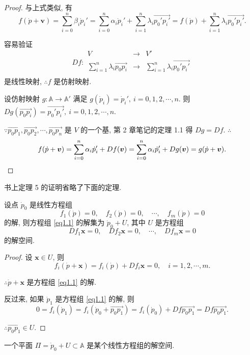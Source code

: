 \documentclass{ctexart}
\begin{document}
\begin{proof}
    与上式类似, 有
    \[f(\dot{p}+\boldsymbol{v})=\sum\limits_{i=0}^n\beta_i\dot{p}_i'=\sum\limits_{i=0}^n\alpha_i\dot{p}_i'+\sum\limits_{i=1}^n\lambda_i\overrightarrow{p_0'p_i'}=f(\dot{p})+\sum\limits_{i=1}^n\lambda_i\overrightarrow{p_0'p_i'}.\]

    容易验证
    \[Df:\begin{array}{rcl}
        V & \to & V' \\
        \sum\limits_{i=1}^n\lambda_i\overrightarrow{p_0p_i} & \to & \sum\limits_{i=1}^n\lambda_i\overrightarrow{p_0'p_i'} \\
    \end{array}\]
    是线性映射, $\therefore f$ 是仿射映射.

    设仿射映射 $g:\mathbb{A}\to\mathbb{A}'$ 满足 $g(\dot{p}_i)=\dot{p}_i',\ i=0,1,2,\cdots,n$. 则 $Dg(\overrightarrow{p_0p_i})=\overrightarrow{p_0'p_i'},\ i=0,1,2,\cdots,n$.

    $\because\overrightarrow{p_0p_1},\overrightarrow{p_0p_2},\cdots,\overrightarrow{p_0p_n}$ 是 $V$ 的一个基, 第 2 章笔记的定理 1.1 得 $Dg=Df$. $\therefore$
    \[f(\dot{p}+\boldsymbol{v})=\sum\limits_{i=0}^n\alpha_i\dot{p}_i'+Df(\boldsymbol{v})=\sum\limits_{i=0}^n\alpha_i\dot{p}_i'+Dg(\boldsymbol{v})=g(\dot{p}+\boldsymbol{v}).\qedhere\]
\end{proof}
书上定理 5 的证明省略了下面的定理.
\begin{theorem}
    设点 $\dot{p}_0$ 是线性方程组
    \begin{equation}\label{eq1.1}
        f_1(\dot{p})=0,\quad f_2(\dot{p})=0,\quad \cdots,\quad f_m(\dot{p})=0
    \end{equation}
    的解, 则方程组 \ref{eq1.1} 的解集为 $\dot{p}_0+U$, 其中 $U$ 是方程组
    \[Df_1\boldsymbol{x}=0,\quad Df_2\boldsymbol{x}=0,\quad \cdots,\quad Df_m\boldsymbol{x}=0\]
    的解空间.
\end{theorem}
\begin{proof}
    设 $\boldsymbol{x}\in U$, 则
    \[f_i(\dot{p}+\boldsymbol{x})=f_i(\dot{p})+Df_i\boldsymbol{x}=0,\quad i=1,2,\cdots,m.\]

    $\therefore\dot{p}+\boldsymbol{x}$ 是方程组 \ref{eq1.1} 的解.

    反过来, 如果 $\dot{p}_1$ 是方程组 \ref{eq1.1} 的解, 则
    \[0=f_i(\dot{p}_1)=f_i(\dot{p}_0+\overrightarrow{p_0p_1})=f_i(\dot{p}_0)+Df\overrightarrow{p_0p_1}=Df\overrightarrow{p_0p_1}.\]

    $\therefore\overrightarrow{p_0p_1}\in U$.
\end{proof}
\begin{theorem}
    一个平面 $\varPi=\dot{p}_0+U\subset\mathbb{A}$ 是某个线性方程组的解空间.
\end{theorem}
\end{document}
